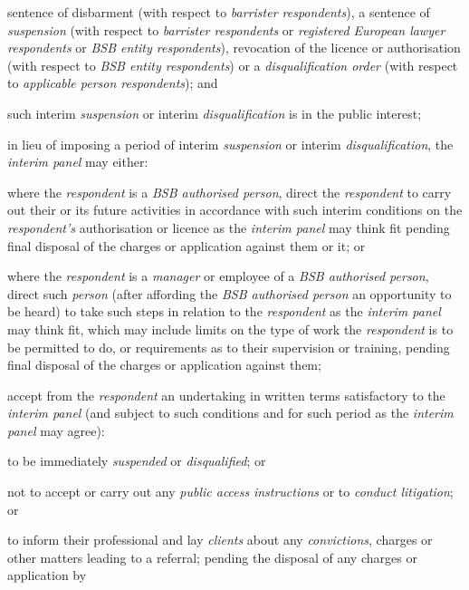 sentence of disbarment (with respect to \emph{barrister respondents}), a
sentence of \emph{suspension} (with respect to \emph{barrister
respondents} or\emph{ registered European lawyer
respondents} or \emph{BSB entity respondents}), revocation of the
licence or authorisation (with respect to \emph{BSB entity respondents})
or a \emph{disqualification order} (with respect to \emph{applicable
person respondents}); and\item such interim \emph{suspension} or interim \emph{disqualification} is
in the public interest;\la \item in lieu of imposing a period of interim \emph{suspension} or
interim \emph{disqualification}, the \emph{interim panel} may either:\al
\item where the \emph{respondent} is a \emph{BSB authorised person}, direct
the \emph{respondent} to carry out their or its future activities in
accordance with such interim conditions on
the \emph{respondent's }authorisation or licence as the \emph{interim
panel} may think fit pending final disposal of the charges or
application against them or it; or\\
\item where the \emph{respondent }is a \emph{manager} or employee of
a \emph{BSB authorised person}, direct such \emph{person} (after
affording the \emph{BSB authorised person} an opportunity to be heard)
to take such steps in relation to the \emph{respondent }as
the \emph{interim panel} may think fit, which may include limits on the
type of work the \emph{respondent }is to be permitted to do, or
requirements as to their supervision or training, pending final disposal
of the charges or application against them;\\
\item accept from the \emph{respondent }an undertaking in written terms
satisfactory to the \emph{interim panel} (and subject to such conditions
and for such period as the \emph{interim panel} may agree):\rl
\item to be immediately \emph{suspended} or \emph{disqualified}; or\\
\item  not to accept or carry out any \emph{public
access} \emph{instructions} or to \emph{conduct litigation}; or\\
\item  to inform their professional and lay \emph{clients} about
any \emph{convictions}, charges or other matters leading to a
referral;\lr\la\ln
pending the disposal of any charges or application by
